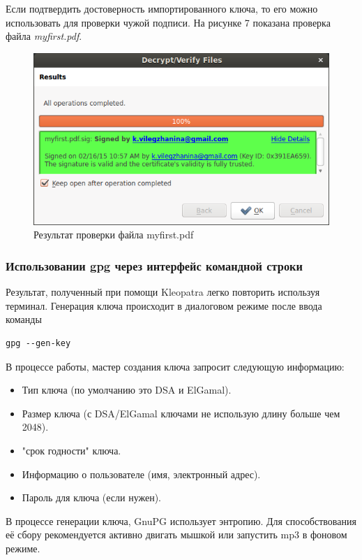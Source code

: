 \documentclass[a4paper, 12pt]{article}		%
\begin{document}
Если подтвердить достоверность импортированного ключа, то его можно использовать для проверки чужой подписи. На рисунке 7 показана проверка файла \textit{myfirst.pdf}.

\begin{figure}[h!]
\centering
\includegraphics[scale=0.67]{res/myfirst_check}
\caption{Результат проверки файла myfirst.pdf}
\end{figure}

\subsubsection{Использовании gpg через интерфейс командной строки}

Результат, полученный при помощи Kleopatra легко повторить используя терминал. Генерация ключа происходит в диалоговом режиме после ввода команды
\begin{verbatim}gpg --gen-key
\end{verbatim}
В процессе работы, мастер создания ключа запросит следующую информацию:
\begin{itemize}
	\item{Тип ключа (по умолчанию это DSA и ElGamal).}
	\item{Размер ключа (с DSA/ElGamal ключами не использую длину больше чем 2048).}
	\item{"срок годности" ключа.}
	\item{Информацию о пользователе (имя, электронный адрес).}
	\item{Пароль для ключа (если нужен).}
\end{itemize}

В процессе генерации ключа, GnuPG использует энтропию. Для способствования её сбору рекомендуется активно двигать мышкой или запустить mp3 в фоновом режиме.
\end{document}
